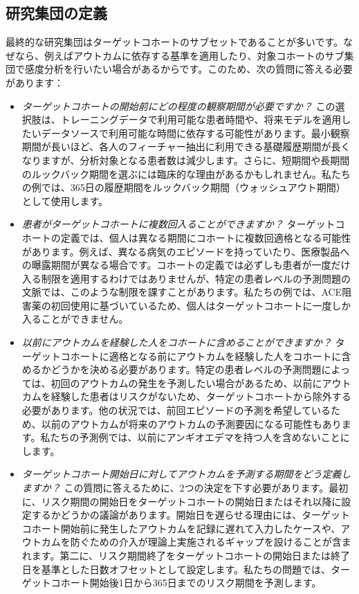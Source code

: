 \documentclass[
  11pt]{book}
\theoremstyle{definition}
\theoremstyle{definition}
\theoremstyle{definition}
\theoremstyle{definition}
\theoremstyle{remark}
\begin{document}
\subsection{研究集団の定義}\label{ux7814ux7a76ux96c6ux56e3ux306eux5b9aux7fa9-1}

最終的な研究集団はターゲットコホートのサブセットであることが多いです。なぜなら、例えばアウトカムに依存する基準を適用したり、対象コホートのサブ集団で感度分析を行いたい場合があるからです。このため、次の質問に答える必要があります：

\begin{itemize}
\item
  \emph{ターゲットコホートの開始前にどの程度の観察期間が必要ですか？} この選択肢は、トレーニングデータで利用可能な患者時間や、将来モデルを適用したいデータソースで利用可能な時間に依存する可能性があります。最小観察期間が長いほど、各人のフィーチャー抽出に利用できる基礎履歴期間が長くなりますが、分析対象となる患者数は減少します。さらに、短期間や長期間のルックバック期間を選ぶには臨床的な理由があるかもしれません。私たちの例では、365日の履歴期間をルックバック期間（ウォッシュアウト期間）として使用します。
\item
  \emph{患者がターゲットコホートに複数回入ることができますか？} ターゲットコホートの定義では、個人は異なる期間にコホートに複数回適格となる可能性があります。例えば、異なる病気のエピソードを持っていたり、医療製品への曝露期間が異なる場合です。コホートの定義では必ずしも患者が一度だけ入る制限を適用するわけではありませんが、特定の患者レベルの予測問題の文脈では、このような制限を課すことがあります。私たちの例では、ACE阻害薬の初回使用に基づいているため、個人はターゲットコホートに一度しか入ることができません。
\item
  \emph{以前にアウトカムを経験した人をコホートに含めることができますか？} ターゲットコホートに適格となる前にアウトカムを経験した人をコホートに含めるかどうかを決める必要があります。特定の患者レベルの予測問題によっては、初回のアウトカムの発生を予測したい場合があるため、以前にアウトカムを経験した患者はリスクがないため、ターゲットコホートから除外する必要があります。他の状況では、前回エピソードの予測を希望しているため、以前のアウトカムが将来のアウトカムの予測要因になる可能性もあります。私たちの予測例では、以前にアンギオエデマを持つ人を含めないことにします。
\item
  \emph{ターゲットコホート開始日に対してアウトカムを予測する期間をどう定義しますか？} この質問に答えるために、2つの決定を下す必要があります。最初に、リスク期間の開始日をターゲットコホートの開始日またはそれ以降に設定するかどうかの議論があります。開始日を遅らせる理由には、ターゲットコホート開始前に発生したアウトカムを記録に遅れて入力したケースや、アウトカムを防ぐための介入が理論上実施されるギャップを設けることが含まれます。第二に、リスク期間終了をターゲットコホートの開始日または終了日を基準とした日数オフセットとして設定します。私たちの問題では、ターゲットコホート開始後1日から365日までのリスク期間を予測します。

\end{itemize}
\end{document}
